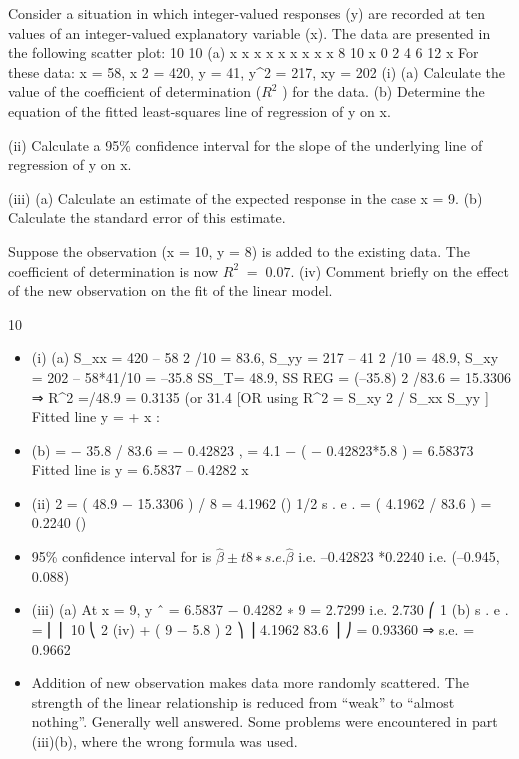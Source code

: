 \documentclass[a4paper,12pt]{article}
\begin{document}
\begin{enumerate}Consider a situation in which integer-valued responses (y) are recorded at ten values
of an integer-valued explanatory variable (x). The data are presented in the following
scatter plot:
10
10
(a)
x
x
x
x
x
x
x
x x
8 10
x
0
2
4
6
12
x
For these data: \sum x = 58, \sum x 2 = 420, \sum y = 41, \sum y^{2} = 217, \sum xy = 202
(i)
(a) Calculate the value of the coefficient of determination ($R^{2}$ ) for the data.
(b) Determine the equation of the fitted least-squares line of regression of
y on x.

(ii) Calculate a 95\% confidence interval for the slope of the underlying line of regression of y on x.

(iii) (a)
Calculate an estimate of the expected response in the case x = 9.
(b) Calculate the standard error of this estimate.

Suppose the observation (x = 10, y = 8) is added to the existing data. The coefficient of determination is now $R^{2} \;=\; 0.07$.
(iv)
Comment briefly on the effect of the new observation on the fit of the linear
model.
\end{enumerate}

10
\begin{itemize}
\item (i)
(a)
S_{xx} = 420 – 58 2 /10 = 83.6, S_{yy} = 217 – 41 2 /10 = 48.9,
S_{xy} = 202 – 58*41/10 = –35.8
SS_{T}= 48.9, SS REG = (–35.8) 2 /83.6 = 15.3306
⇒ R^{2} \;=/48.9 = 0.3135 (or 31.4%
[OR using R^{2} \;=\; S_{xy} 2 / S_{xx} S_{yy} ]
Fitted line y = \hat{\alpha}+ \hat{\beta} x :
\item(b)
\hat{\beta} = − 35.8 / 83.6 = − 0.42823 , \hat{\alpha}= 4.1 − ( − 0.42823*5.8 ) = 6.58373
Fitted line is y = 6.5837 – 0.4282 x

\item (ii)
\hat{\sigma} 2 = ( 48.9 − 15.3306 ) / 8 = 4.1962
()
1/2
s . e . \hat{\beta} = ( 4.1962 / 83.6 ) = 0.2240
()
\item 
95\% confidence interval for \beta is $\hat{\beta} \pm  t 8 ∗ s . e . \hat{\beta}$
i.e. –0.42823 *0.2240
i.e. (–0.945, 0.088)
\item (iii)
(a) At x = 9, y ˆ = 6.5837 − 0.4282 ∗ 9 = 2.7299 i.e. 2.730
⎛ 1
(b) s . e . = ⎜
⎜ 10
⎝
2
(iv)
+
( 9 − 5.8 ) 2 ⎞ ⎟ 4.1962
83.6
⎟
⎠
= 0.93360 ⇒ s.e. = 0.9662

\item Addition of new observation makes data more randomly scattered. The
strength of the linear relationship is reduced from “weak” to “almost nothing”.
Generally well answered. Some problems were encountered in part (iii)(b), where the wrong
formula was used.
\end{itemize}
\end{document}
